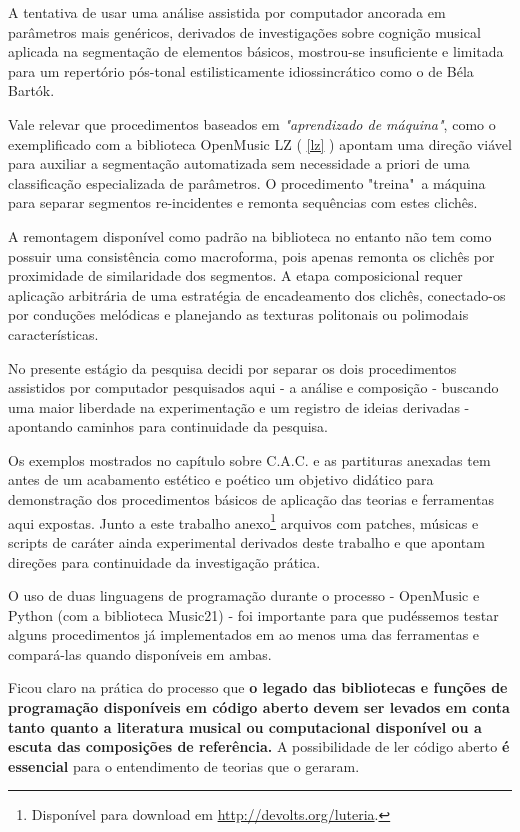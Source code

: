 \documentclass[
	12pt,				%
	openright,			%
	twoside,			%
	a4paper,			%
	english,			%
	french,				%
	spanish,			%
	brazil				%
	]{abntex2}
\begin{document}
A tentativa de usar uma análise assistida por computador ancorada em parâmetros mais genéricos, derivados de investigações sobre cognição musical aplicada na segmentação de elementos básicos, mostrou-se insuficiente e limitada para um repertório pós-tonal estilisticamente idiossincrático como o de Béla Bartók.

Vale relevar que procedimentos baseados em \textit{"aprendizado de máquina"}, como o exemplificado com a biblioteca OpenMusic LZ ( \autoref{lz} ) apontam uma direção viável para auxiliar a segmentação automatizada sem necessidade a priori de uma classificação especializada de parâmetros. O procedimento "treina"\ a máquina para separar segmentos re-incidentes e remonta sequências com estes clichês. 

A remontagem disponível como padrão na biblioteca no entanto não tem como possuir uma consistência como macroforma, pois apenas remonta os clichês por proximidade de similaridade dos segmentos.
A etapa composicional requer aplicação arbitrária de uma estratégia de encadeamento dos clichês, conectado-os por conduções melódicas e planejando as texturas politonais ou polimodais características.

No presente estágio da pesquisa decidi por separar os dois procedimentos assistidos por computador pesquisados aqui - a análise e composição - buscando uma maior liberdade na experimentação e um registro de ideias derivadas - apontando caminhos para continuidade da pesquisa.

Os exemplos mostrados no capítulo sobre C.A.C. e as partituras anexadas tem antes de um acabamento estético e poético um objetivo didático para demonstração dos procedimentos básicos de aplicação das teorias e ferramentas aqui expostas. Junto a este trabalho anexo\footnote{Disponível para download em \url{http://devolts.org/luteria}.} arquivos com patches, músicas e scripts de caráter ainda experimental derivados deste trabalho e que apontam direções para continuidade da investigação prática.

O uso de duas linguagens de programação durante o processo - OpenMusic e Python (com a biblioteca Music21)  - foi importante para que pudéssemos testar alguns procedimentos já implementados em ao menos uma das ferramentas e compará-las quando disponíveis em ambas. 

Ficou claro na prática do processo que \textbf{o legado das bibliotecas e funções de programação disponíveis em código aberto devem ser levados em conta tanto quanto a literatura musical ou computacional disponível ou a escuta das composições de referência.} A possibilidade de ler código aberto\textbf{ é essencial} para o entendimento de teorias que o geraram.
\end{document}
